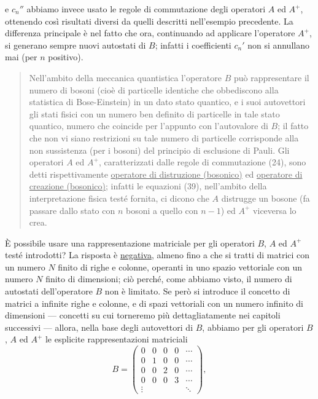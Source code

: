 \documentclass[11pt, a4paper]{book}
\numberwithin{equation}{section}
\begin{document}

e $c_n''$ abbiamo invece usato le regole di commutazione degli operatori
$A$ ed $A^+$, ottenendo così risultati diversi da quelli descritti
nell'esempio precedente. La differenza principale è nel fatto che ora,
continuando ad applicare l'operatore $A^+$, si generano sempre nuovi
autostati di $B$; infatti i coefficienti $c_n'$ non si annullano mai (per
$n$ positivo).

\begin{quote}
Nell'ambito della meccanica quantistica l'operatore $B$ può rappresentare
il numero di bosoni (cioè di particelle identiche che obbediscono alla
statistica di Bose-Einstein) in un dato stato quantico, e i suoi
autovettori gli stati fisici con un numero ben definito di particelle in
tale stato quantico, numero che coincide per l'appunto con l'autovalore di
$B$; il fatto che non vi siano restrizioni su tale numero di particelle
corrisponde alla non sussistenza (per i bosoni) del principio di
esclusione di Pauli. Gli operatori $A$ ed $A^+$, caratterizzati dalle
regole di commutazione (24), sono detti rispettivamente
\underline{operatore di distruzione (bosonico)} ed \underline{operatore di
creazione (bosonico)}; infatti le equazioni (39), nell'ambito della
interpretazione fisica testé fornita, ci dicono che $A$ distrugge un
bosone (fa passare dallo stato con $n$ bosoni a quello con $n-1$) ed $A^+$
viceversa lo crea.
\end{quote}

È possibile usare una rappresentazione matriciale per gli operatori $B$,
$A$ ed $A^+$ testé introdotti? La risposta è \underline{negativa}, almeno
fino a che si tratti di matrici con un numero $N$ finito di righe e
colonne, operanti in uno spazio vettoriale con un numero $N$ finito di
dimensioni; ciò perché, come abbiamo visto, il numero di autostati
dell'operatore $B$ non è limitato. Se però si introduce il concetto di
matrici a infinite righe e colonne, e di spazi vettoriali con un numero
infinito di dimensioni --- concetti su cui torneremo più dettagliatamente
nei capitoli successivi --- allora, nella base degli autovettori di $B$,
abbiamo per gli operatori $B$, $A$ ed $A^+$ le esplicite rappresentazioni
matriciali
\begin{equation}
B =
\begin{pmatrix}
0 & 0 & 0 & 0 & \cdots \\
0 & 1 & 0 & 0 & \cdots \\
0 & 0 & 2 & 0 & \cdots \\
0 & 0 & 0 & 3 & \cdots \\
\vdots & & & & \ddots
\end{pmatrix},
\end{equation}
\end{document}

